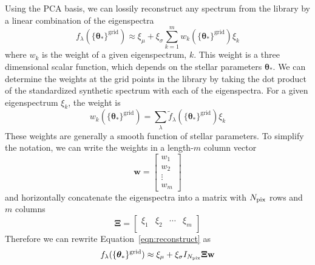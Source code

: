 \documentclass[iop,floatfix,twocolappendix]{emulateapj}
\newcommand{\vt}{ {\bm \theta}}
\begin{document}
Using the PCA basis, we can lossily reconstruct any spectrum from the library by a linear combination of the eigenspectra
\begin{equation}
  f_\lambda(\{\vt_\ast \}^\textrm{grid}) \approx \xi_\mu + \xi_\sigma \sum_{k=1}^m w_k(\{\vt_\ast \}^\textrm{grid}) \xi_k
  \label{eqn:reconstruct}
\end{equation}
where $w_k$ is the weight of a given eigenspectrum, $k$. This weight is a three dimensional scalar function, which depends on the stellar parameters $\vt_\ast$. We can determine the weights at the grid points in the library by taking the dot product of the standardized synthetic spectrum with each of the eigenspectra. For a given eigenspectrum $\xi_k$, the weight is 
\begin{equation}
  w_k(\{\vt_\ast \}^\textrm{grid}) = \sum_\lambda \widetilde{f}_\lambda(\{\vt_\ast \}^\textrm{grid}) \xi_k
\end{equation}
These weights are generally a smooth function of stellar parameters. To simplify the notation, we can write the weights in a length-$m$ column vector
\begin{equation}
  \mathbf{w} = 
  \begin{bmatrix}
    w_1\\
    w_2\\
    \vdots\\
    w_m
  \end{bmatrix}
\end{equation}
and horizontally concatenate the eigenspectra into a matrix with $N_{\rm pix}$ rows and $m$ columns
\begin{equation}
  \mathbf{\Xi} = 
  \begin{bmatrix}
    \xi_1 & \xi_2 & \cdots & \xi_m \\
  \end{bmatrix}
\end{equation}
Therefore we can rewrite Equation~\ref{eqn:reconstruct} as
\begin{equation}
  f_\lambda(\{\vt_\ast \}^\textrm{grid}) \approx \xi_\mu + \xi_\sigma I_{N_{\rm pix}} \mathbf{\Xi} \mathbf{w}
\end{equation}
\end{document}
